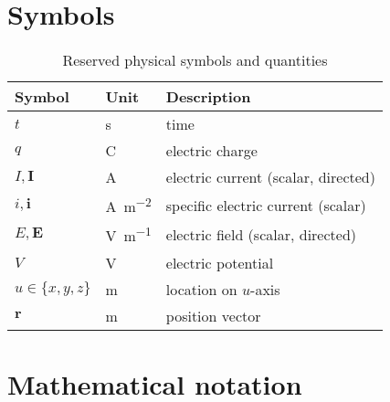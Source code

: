 \documentclass[prodtf]{EngC}
\numberwithin{equation}{chapter}
\numberwithin{figure}{chapter}
\numberwithin{table}{chapter}
\begin{document}
\chapter*{Symbols}

\begin{table}[!htb]
\caption{Reserved physical symbols and quantities}
\label{tab:symbols}
\begin{tabular}{|l|l|l|}
\hline
Symbol 				& Unit 					& Description \\
\hline
$t$ 				& \si{\second}  		& time \\
$q$					& \si{\coulomb} 		& electric charge \\
$I, \mathbf{I}$ 				& \si{\ampere} 			& electric current (scalar, directed) \\
$i, \mathbf{i}$ 				& \si{\ampere\per\metre^2} 			& specific electric current (scalar) \\
$E,\mathbf{E}$		& \si{\volt\per\metre} 	& electric field (scalar, directed) \\
$V$ 				& \si{\volt} 			& electric potential \\
$u \in \{ x,y,z \}$	& \si{\metre} 			& location on $u$-axis \\
$\mathbf{r}$		& \si{\metre} 			& position vector \\
\hline
\end{tabular}
\end{table}





\chapter*{Mathematical notation}
\end{document}
